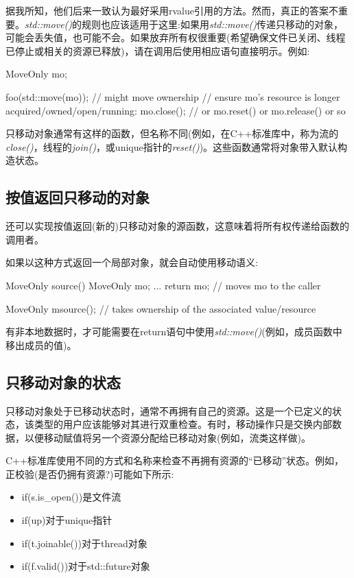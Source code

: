 据我所知，他们后来一致认为最好采用rvalue引用的方法。然而，真正的答案不重要。\textit{std::move()}的规则也应该适用于这里:如果用\textit{std::move()}传递只移动的对象，可能会丢失值，也可能不会。如果放弃所有权很重要(希望确保文件已关闭、线程已停止或相关的资源已释放)，请在调用后使用相应语句直接明示。例如:

\begin{cppcode}
MoveOnly mo;

foo(std::move(mo)); // might move ownership
// ensure mo’s resource is longer acquired/owned/open/running:
mo.close(); // or mo.reset() or mo.release() or so
\end{cppcode}

只移动对象通常有这样的函数，但名称不同(例如，在C++标准库中，称为流的\textit{close()}，线程的\textit{join()}，或unique指针的\textit{reset()})。这些函数通常将对象带入默认构造状态。

\subsection{按值返回只移动的对象}

还可以实现按值返回(新的)只移动对象的源函数，这意味着将所有权传递给函数的调用者。

如果以这种方式返回一个局部对象，就会自动使用移动语义:

\begin{cppcode}
MoveOnly source()
{
	MoveOnly mo;
	...
	return mo; // moves mo to the caller
}

MoveOnly m{source()}; // takes ownership of the associated value/resource
\end{cppcode}

有非本地数据时，才可能需要在return语句中使用\textit{std::move()}(例如，成员函数中移出成员的值)。

\subsection{只移动对象的状态}

只移动对象处于已移动状态时，通常不再拥有自己的资源。这是一个已定义的状态，该类型的用户应该能够对其进行双重检查。有时，移动操作只是交换内部数据，以便移动赋值将另一个资源分配给已移动对象(例如，流类这样做)。

C++标准库使用不同的方式和名称来检查不再拥有资源的“已移动”状态。例如，正校验(是否仍拥有资源?)可能如下所示:

\begin{itemize}
	\item if(s.is_open())是文件流
	\item if(up)对于unique指针
	\item if(t.joinable())对于thread对象
	\item if(f.valid())对于std::future对象
\end{itemize}














